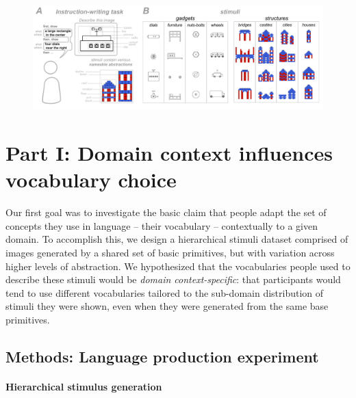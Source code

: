 \documentclass[10pt,letterpaper]{article}
\begin{document}
\begin{figure}
  \begin{center}
  \includegraphics[width=0.99\linewidth]{figures/task_fig_full.pdf}
  \caption{}
  \label{fig:task}
  \end{center}
  \end{figure}    

\section{Part I: Domain context influences vocabulary choice} \label{sec-dataset}

Our first goal was to investigate the basic claim that people adapt the set of concepts they use in language -- their vocabulary -- contextually to a given domain. To accomplish this, we design a hierarchical stimuli dataset comprised of images generated by a shared set of basic primitives, but with variation across higher levels of abstraction. We hypothesized that the vocabularies people used to describe these stimuli would be \textit{domain context-specific}: that participants would tend to use different vocabularies tailored to the sub-domain distribution of stimuli they were shown, even when they were generated from the same base primitives. %

\subsection{Methods: Language production experiment}



\paragraph{Hierarchical stimulus generation} %
\end{document}
